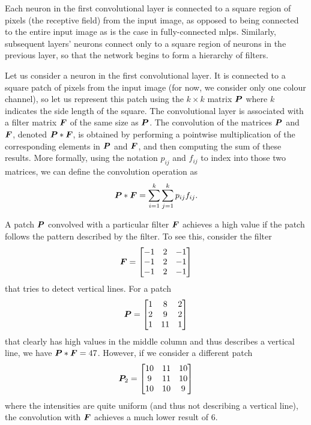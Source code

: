 \documentclass[../report.tex]{subfiles}
\begin{document}
Each neuron in the first convolutional layer is connected to a square region of pixels (the receptive field) from the input image, as opposed to being connected to the entire input image as is the case in fully-connected \glspl{mlp}.
Similarly, subsequent layers' neurons connect only to a square region of neurons in the previous layer, so that the network begins to form a hierarchy of filters.

Let us consider a neuron in the first convolutional layer.
It is connected to a square patch of pixels from the input image (for now, we consider only one colour channel), so let us represent this patch using the $k\times k$ matrix ${\bm{P}}$ where $k$ indicates the side length of the square.
The convolutional layer is associated with a filter matrix ${\bm{F}}$ of the same size as ${\bm{P}}$.
The convolution of the matrices ${\bm{P}}$ and ${\bm{F}}$, denoted ${\bm{P}} * {\bm{F}}$, is obtained by performing a pointwise multiplication of the corresponding elements in ${\bm{P}}$ and ${\bm{F}}$, and then computing the sum of these results.
More formally, using the notation $p_{ij}$ and $f_{ij}$ to index into those two matrices, we can define the convolution operation as
\begin{equation}
    {\bm{P}} * {\bm{F}} = \sum_{i=1}^k \sum_{j=1}^k p_{ij} f_{ij}.
\end{equation}

A patch ${\bm{P}}$ convolved with a particular filter ${\bm{F}}$ achieves a high value if the patch follows the pattern described by the filter.
To see this, consider the filter
\begin{equation*}
    {\bm{F}} = \begin{bmatrix}
        -1 & 2 & -1 \\
        -1 & 2 & -1 \\
        -1 & 2 & -1
    \end{bmatrix}
\end{equation*}
that tries to detect vertical lines.
For a patch
\begin{equation*}
    {\bm{P}} = \begin{bmatrix}
        1 & 8 & 2 \\
        2 & 9 & 2 \\
        1 & 11 & 1
    \end{bmatrix}
\end{equation*}
that clearly has high values in the middle column and thus describes a vertical line, 
we have ${\bm{P}} * {\bm{F}} = 47$. However, if we consider a different patch
\begin{equation*}
    {\bm{P}}_2 = \begin{bmatrix}
        10 & 11 & 10 \\
        9 & 11 & 10 \\
        10 & 10 & 9
    \end{bmatrix}
\end{equation*}
where the intensities are quite uniform (and thus not describing a vertical line), the convolution with ${\bm{F}}$ achieves a much lower result of $6$.
\end{document}
